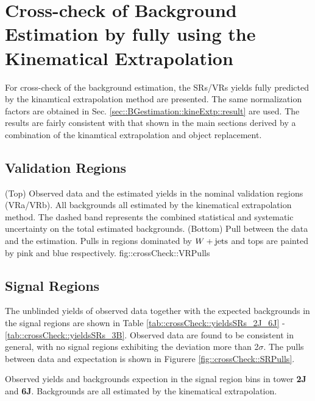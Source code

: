 \clearpage
\section{Cross-check of Background Estimation by fully using the Kinematical Extrapolation}  \label{sec::crossCheckBGestm}
For cross-check of the background estimation, the SRs/VRs yields fully predicted by the kinamtical extrapolation method are presented.
The same normalization factors are obtained in Sec. \ref{sec::BGestimation::kineExtp::result} are used. 
The results are fairly consistent with that shown in the main sections derived by a combination of the kinamtical extrapolation and object replacement. \\
 

\subsection{Validation Regions}

{(Top) Observed data and the estimated yields in the nominal validation regions (VRa/VRb). 
All backgrounds all estimated by the kinematical extrapolation method. The dashed band represents the combined statistical and systematic uncertainty on the total estimated backgrounds. (Bottom) Pull between the data and the estimation. Pulls in regions dominated by $W+\mathrm{jets}$ and tops are painted by pink and blue respectively.}
{fig::crossCheck::VRPulls}

\clearpage

\clearpage

\subsection{Signal Regions}
The unblinded yields of observed data together with the expected backgrounds in the signal regions are shown in Table \ref{tab::crossCheck::yieldsSRs_2J_6J} - \ref{tab::crossCheck::yieldsSRs_3B}. Observed data are found to be consistent in general, with no signal regions exhibiting the deviation more than 2$\sigma$.
The pulls between data and expectation is shown in Figurere \ref{fig::crossCheck::SRPulls}.

\begin{table}[h]
  \begin{center}
    \caption{
        Observed yields and backgrounds expection in the signal region bins in tower \textbf{2J} and \textbf{6J}.
        Backgrounds are all estimated by the kinematical extrapolation. 
    \label{tab::crossCheck::yieldsSRs_2J_6J}}
    
    
  \end{center}
\end{table}

